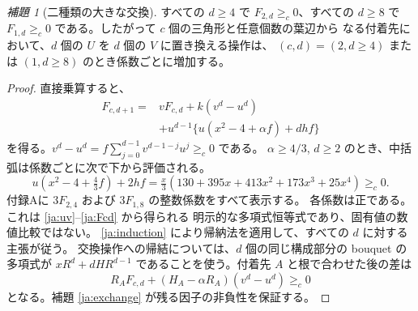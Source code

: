 \documentclass[12pt]{amsart}
\theoremstyle{definition}
\theoremstyle{remark}
\numberwithin{equation}{section}
\newtheorem{jlem}[thm]{補題}
\begin{document}
\begin{jlem}[二種類の大きな交換]\label{ja:large}
すべての $d\ge4$ で $F_{2,d}\ge_c0$、すべての $d\ge8$ で
$F_{1,d}\ge_c0$ である。したがって $c$ 個の三角形と任意個数の葉辺から
なる付着先において、$d$ 個の $U$ を $d$ 個の $V$ に置き換える操作は、
$(c,d)=(2,d\ge4)$ または $(1,d\ge8)$ のとき係数ごとに増加する。
\end{jlem}
\begin{proof}
直接乗算すると、
\begin{align}
 F_{c,d+1}={}&vF_{c,d}+k(v^d-u^d)\nonumber\\
 &+u^{d-1}\{u(x^2-4+\alpha f)+dhf\}\label{ja:induction}
\end{align}
を得る。$v^d-u^d=f\sum_{j=0}^{d-1}v^{d-1-j}u^j\ge_c0$ である。
$\alpha\ge4/3$, $d\ge2$ のとき、中括弧は係数ごとに次で下から評価される。
\begin{equation}\label{ja:Kpositive}
 u(x^2-4+\tfrac43f)+2hf
   =\tfrac{x}{3}(130+395x+413x^2+173x^3+25x^4)\ge_c0.
\end{equation}
付録Aに $3F_{2,4}$ および $3F_{1,8}$ の整数係数をすべて表示する。
各係数は正である。これは \eqref{ja:uv}--\eqref{ja:Fcd} から得られる
明示的な多項式恒等式であり、固有値の数値比較ではない。
\eqref{ja:induction} により帰納法を適用して、すべての $d$ に対する主張が従う。
交換操作への帰結については、$d$ 個の同じ構成部分の bouquet の多項式が
$xR^d+dHR^{d-1}$ であることを使う。付着先 $A$ と根で合わせた後の差は
\[
 R_AF_{c,d}+(H_A-\alpha R_A)(v^d-u^d)\ge_c0
\]
となる。補題 \ref{ja:exchange} が残る因子の非負性を保証する。
\end{proof}
\end{document}
